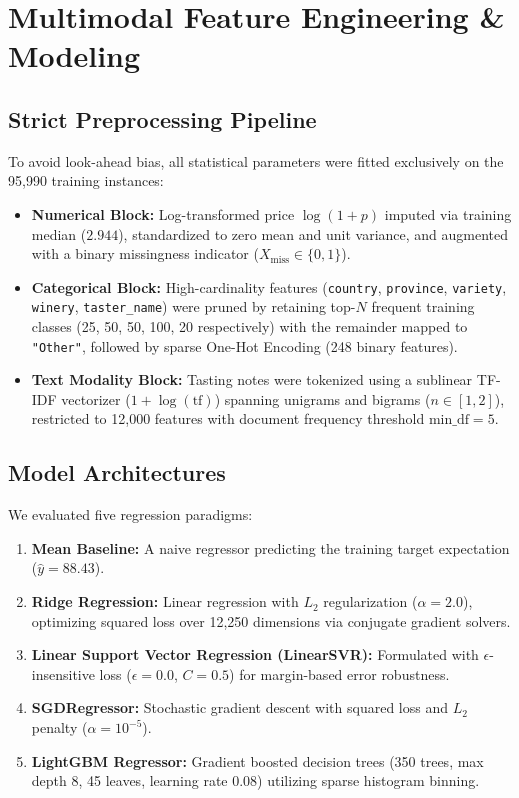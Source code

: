\documentclass[conference]{IEEEtran}
\begin{document}
\section{Multimodal Feature Engineering \& Modeling}
\subsection{Strict Preprocessing Pipeline}
To avoid look-ahead bias, all statistical parameters were fitted exclusively on the 95,990 training instances:
\begin{itemize}
    \item \textbf{Numerical Block:} Log-transformed price $\log(1 + p)$ imputed via training median ($2.944$), standardized to zero mean and unit variance, and augmented with a binary missingness indicator ($X_{\text{miss}} \in \{0, 1\}$).
    \item \textbf{Categorical Block:} High-cardinality features (\texttt{country}, \texttt{province}, \texttt{variety}, \texttt{winery}, \texttt{taster\_name}) were pruned by retaining top-$N$ frequent training classes (25, 50, 50, 100, 20 respectively) with the remainder mapped to \texttt{"Other"}, followed by sparse One-Hot Encoding (248 binary features).
    \item \textbf{Text Modality Block:} Tasting notes were tokenized using a sublinear TF-IDF vectorizer ($1 + \log(\text{tf})$) spanning unigrams and bigrams ($n \in [1, 2]$), restricted to 12,000 features with document frequency threshold $\text{min\_df} = 5$.
\end{itemize}

\subsection{Model Architectures}
We evaluated five regression paradigms:
\begin{enumerate}
    \item \textbf{Mean Baseline:} A naive regressor predicting the training target expectation ($\hat{y} = 88.43$).
    \item \textbf{Ridge Regression:} Linear regression with $L_2$ regularization ($\alpha = 2.0$), optimizing squared loss over 12,250 dimensions via conjugate gradient solvers.
    \item \textbf{Linear Support Vector Regression (LinearSVR):} Formulated with $\epsilon$-insensitive loss ($\epsilon = 0.0$, $C = 0.5$) for margin-based error robustness.
    \item \textbf{SGDRegressor:} Stochastic gradient descent with squared loss and $L_2$ penalty ($\alpha = 10^{-5}$).
    \item \textbf{LightGBM Regressor:} Gradient boosted decision trees (350 trees, max depth 8, 45 leaves, learning rate 0.08) utilizing sparse histogram binning.
\end{enumerate}
\end{document}
